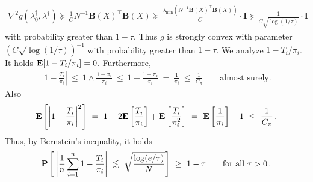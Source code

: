 \begin{gather}
  \nabla^2 
  g(\lambda_0^\dagger,\lambda^\dagger)
  \succcurlyeq
  \frac{1}{C}
  N^{-1}
  \mathbf{B}(X)^\top
  \mathbf{B}(X)
  \succcurlyeq
  \frac{\lambda_{\min}(
  N^{-1}
  \mathbf{B}(X)^\top
  \mathbf{B}(X)
  )}{C}
  \cdot
  \mathbf{I}
  \succcurlyeq
  \frac{1}
  {
  C \sqrt{\log(1/\tau)}
}
  \cdot
  \mathbf{I}
\end{gather}
with probability greater than $1-\tau$.
Thus $g$ is strongly convex with parameter 
$
\left(
  C \sqrt{\log(1/\tau)}
\right)^{-1}
$
with probability greater than $1-\tau$.
We analyze
$
1-T_i/\pi_i
$.
It holds
$\mathbf{E}[
1-T_i/\pi_i
]=0$.
Furthermore,
\begin{gather}
  \left| 
1
-
\frac{T_i}{\pi_i}
  \right|
  \ 
\le
  \ 
1
\land
\frac{1-\pi_i}{\pi_i}
  \ 
\le
  \ 
1
+
\frac{1-\pi_i}{\pi_i}
  \ 
=
  \ 
\frac{1}{\pi_i}
  \ 
\le
  \ 
\frac{1}{C_\pi}
\qquad
\text{almost surely.}
\end{gather}
Also
\begin{gather}
  \E
  \left[ 
  \left| 
1
-
\frac{T_i}{\pi_i}
  \right|
  ^2
  \right]
\ 
=
\ 
1
-
2
\E
\left[ 
\frac{T_i}{\pi_i}
\right]
+
\E
\left[ 
\frac{T_i}{\pi_i^2}
\right]
\ 
=
\ 
\E
\left[ 
\frac{1}{\pi_i}
\right]
-1
\ 
\le
\ 
\frac{1}{C_\pi}
\,.
\end{gather}
Thus, by Bernstein's inequality, it holds
\begin{gather}
   \P
    \left[ 
      \,
      \left| 
      \frac{1}{n}
        \sum_{i=1}^{n} 
1
-
\frac{T_i}{\pi_i}
      \right|
      \ 
      \lesssim
      \ 
      \sqrt{
        \frac{
        \log (e/\tau)}
      {N}
      }
    \right]
    \ 
    \ge
    \ 
    1-\tau
    \qquad
    \text{for all}\ 
    \tau
    >
    0
    \,.
\end{gather}

